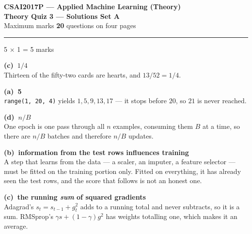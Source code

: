 \documentclass[10pt,a4paper]{article}
\newcommand{\SetLetter}{}
\newcommand{\parthead}[2]{\vspace{2pt}\noindent\rule{\linewidth}{0.4pt}\par\vspace{2pt}%
  \noindent{\bfseries Part #1}\hfill{\small #2}\par\vspace{1pt}}
\newcommand{\sol}[1]{\textbf{#1}}
\begin{document}
\renewcommand{\SetLetter}{A}\setcounter{page}{1}

\begin{center}
{\large\bfseries CSAI2017P --- Applied Machine Learning (Theory)}\\[2pt]
{\large\bfseries Theory Quiz 3 --- Solutions \quad\textbullet\quad Set A}\\[3pt]
{\small Maximum marks \textbf{20} \quad\textbullet{} questions on four pages}
\end{center}
\vspace{2pt}

\noindent{}
\vspace{3pt}


\parthead{A --- Multiple choice}{5 $\times$ 1 = 5 marks}

\begin{sA}

  \item \sol{(c)\ $1/4$}\\ Thirteen of the fifty-two cards are hearts, and $13/52 = 1/4$.

  \item \sol{(a)\ 5}\\ \texttt{range(1, 20, 4)} yields $1, 5, 9, 13, 17$ --- it stops before $20$, so $21$ is never reached.

  \item \sol{(d)\ $n/B$}\\ One epoch is one pass through all $n$ examples, consuming them $B$ at a time, so there are $n/B$ batches and therefore $n/B$ updates.

  \item \sol{(b)\ information from the test rows influences training}\\ A step that learns from the data --- a scaler, an imputer, a feature selector --- must be fitted on the training portion only. Fitted on everything, it has already seen the test rows, and the score that follows is not an honest one.

  \item \sol{(c)\ the running \emph{sum} of squared gradients}\\ Adagrad's $s_t = s_{t-1} + g_t^2$ adds to a running total and never subtracts, so it is a sum. RMSprop's $\gamma s + (1-\gamma)g^2$ has weights totalling one, which makes it an average.

\end{sA}
\end{document}
